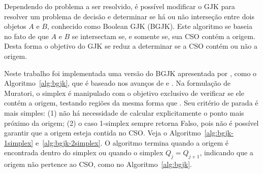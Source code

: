 Dependendo do problema a ser resolvido, é possível modificar o GJK para resolver um problema de decisão e determinar se há ou não interseção entre dois objetos $A$ e $B$, conhecido como Boolean GJK (BGJK). Este algoritmo se baseia no fato de que $A$ e $B$ se intersectam se, e somente se, sua CSO contém a origem. Desta forma o objetivo do GJK se reduz a determinar se a CSO contém ou não a origem. 

Neste trabalho foi implementada uma versão do BGJK apresentada por , como o Algoritmo~\ref{alg:bgjk}, que é baseado nos avanços de  e . Na formulação de Muratori, o simplex é manipulado com o objetivo exclusivo de verificar se ele contém a origem, testando regiões da mesma forma que . Seu critério de parada é mais simples: (1) não há necessidade de calcular explicitamente o ponto mais próximo da origem; 
(2) o caso 1-simplex sempre retorna Falso, pois não é possível garantir que a origem esteja contida no CSO. Veja o Algoritmo~\ref{alg:bgjk-1simplex} e~\ref{alg:bgjk-2simplex}. O algoritmo termina quando a origem é encontrada dentro do simplex ou quando o simplex $Q_j = Q_{j+1}$, indicando que a origem não pertence ao CSO, como no Algoritmo~\ref{alg:bgjk}.

